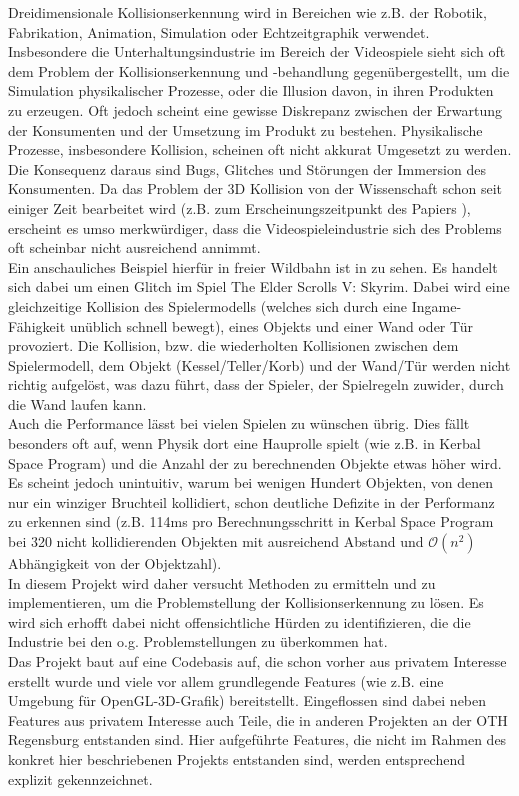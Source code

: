 
Dreidimensionale Kollisionserkennung wird in Bereichen wie z.B. der Robotik, Fabrikation, Animation, Simulation oder Echtzeitgraphik verwendet.
Insbesondere die Unterhaltungsindustrie im Bereich der Videospiele sieht sich oft dem Problem der Kollisionserkennung und -behandlung gegenübergestellt, um die Simulation physikalischer Prozesse, oder die Illusion davon, in ihren Produkten zu erzeugen.
Oft jedoch scheint eine gewisse Diskrepanz zwischen der Erwartung der Konsumenten und der Umsetzung im Produkt zu bestehen. Physikalische Prozesse, insbesondere Kollision, scheinen oft nicht akkurat Umgesetzt zu werden. Die Konsequenz daraus sind Bugs, Glitches und Störungen der Immersion des Konsumenten.
Da das Problem der 3D Kollision von der Wissenschaft schon seit einiger Zeit bearbeitet wird (z.B. zum Erscheinungszeitpunkt des Papiers \cite{gjk}), erscheint es umso merkwürdiger, dass die Videospieleindustrie sich des Problems oft scheinbar nicht ausreichend annimmt.\\
Ein anschauliches Beispiel hierfür in freier Wildbahn ist in \cite{skyrimwallglitch} zu sehen. Es handelt sich dabei um einen Glitch im Spiel The Elder Scrolls V: Skyrim. Dabei wird eine gleichzeitige Kollision des Spielermodells (welches sich durch eine Ingame-Fähigkeit unüblich schnell bewegt), eines Objekts und einer Wand oder Tür provoziert. Die Kollision, bzw. die wiederholten Kollisionen zwischen dem Spielermodell, dem Objekt (Kessel/Teller/Korb) und der Wand/Tür werden nicht richtig aufgelöst, was dazu führt, dass der Spieler, der Spielregeln zuwider, durch die Wand laufen kann.\\
Auch die Performance lässt bei vielen Spielen zu wünschen übrig. Dies fällt besonders oft auf, wenn Physik dort eine Hauprolle spielt (wie z.B. in Kerbal Space Program) und die Anzahl der zu berechnenden Objekte etwas höher wird. Es scheint jedoch unintuitiv, warum bei wenigen Hundert Objekten, von denen nur ein winziger Bruchteil kollidiert, schon deutliche Defizite in der Performanz zu erkennen sind (z.B. 114ms pro Berechnungsschritt in Kerbal Space Program bei 320 nicht kollidierenden Objekten mit ausreichend Abstand und $\mathcal{O}(n^2)$ Abhängigkeit von der Objektzahl).\\
In diesem Projekt wird daher versucht Methoden zu ermitteln und zu implementieren, um die Problemstellung der Kollisionserkennung zu lösen. Es wird sich erhofft dabei nicht offensichtliche Hürden zu identifizieren, die die Industrie bei den o.g. Problemstellungen zu überkommen hat. \\
Das Projekt baut auf eine Codebasis auf, die schon vorher aus privatem Interesse erstellt wurde und viele vor allem grundlegende Features (wie z.B. eine Umgebung für OpenGL-3D-Grafik) bereitstellt. Eingeflossen sind dabei neben Features aus privatem Interesse auch Teile, die in anderen Projekten an der OTH Regensburg entstanden sind. Hier aufgeführte Features, die nicht im Rahmen des konkret hier beschriebenen Projekts entstanden sind, werden entsprechend explizit gekennzeichnet.
